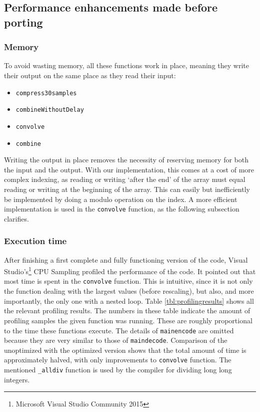 \documentclass[a4paper]{article}
\begin{document}
\subsection{Performance enhancements made before porting}\label{sec:performance}
\subsubsection{Memory}
To avoid wasting memory, all these functions work in place, meaning they write their output on the same place as they read their input:
\begin{itemize}[noitemsep]
\item \texttt{compress30samples}
\item \texttt{combineWithoutDelay}
\item \texttt{convolve}
\item \texttt{combine}
\end{itemize}
Writing the output in place removes the necessity of reserving memory for both the input and the output. With our implementation, this comes at a cost of more complex indexing, as reading or writing `after the end' of the array must equal reading or writing at the beginning of the array. This can easily but inefficiently be implemented by doing a modulo operation on the index. A more efficient implementation is used in the \texttt{convolve} function, as the following subsection clarifies.
\subsubsection{Execution time}\label{sec:processing}
After finishing a first complete and fully functioning version of the code, Visual Studio's\footnote{Microsoft Visual Studio Community 2015} CPU Sampling profiled the performance of the code. It pointed out that most time is spent in the \texttt{convolve} function. This is intuitive, since it is not only the function dealing with the largest values (before rescaling), but also, and more importantly, the only one with a nested loop. Table \ref{tbl:profilingresults} shows all the relevant profiling results. The numbers in these table indicate the amount of profiling samples the given function was running. These are roughly proportional to the time these functions execute. The details of \texttt{mainencode} are omitted because they are very similar to those of \texttt{maindecode}. Comparison of the unoptimized with the optimized version shows that the total amount of time is approximately halved, with only improvements to \texttt{convolve} function. The mentioned \texttt{\_alldiv} function is used by the compiler for dividing long long integers.\\
\end{document}
